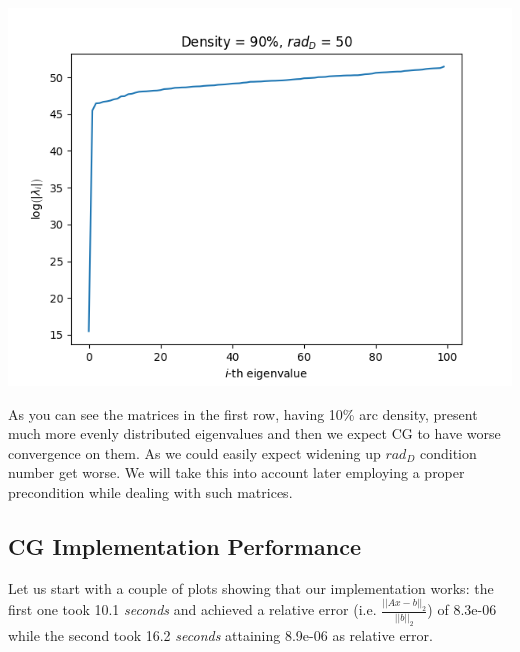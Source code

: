 \documentclass[12pt]{article}
\newcommand{\1}{\mathbbm{1}}
\begin{document}
{\includegraphics[scale=0.5, H]{eigen-100-90-50.png}

As you can see the matrices in the first row, having 10\% arc density, present much more evenly distributed eigenvalues and then we expect CG to have worse convergence on them. As we could easily expect widening up $rad_D$ condition number get worse. We will take this into account later employing a proper precondition while dealing with such matrices.  

\subsection{CG Implementation Performance}
Let us start with a couple of plots showing that our implementation works: the first one took 10.1 \textit{seconds} and achieved a relative error (i.e. $\frac{||Ax - b||_2}{||b||_2}$) of 8.3e-06 while the second took 16.2 \textit{seconds} attaining 8.9e-06 as relative error. 

}
\end{document}
